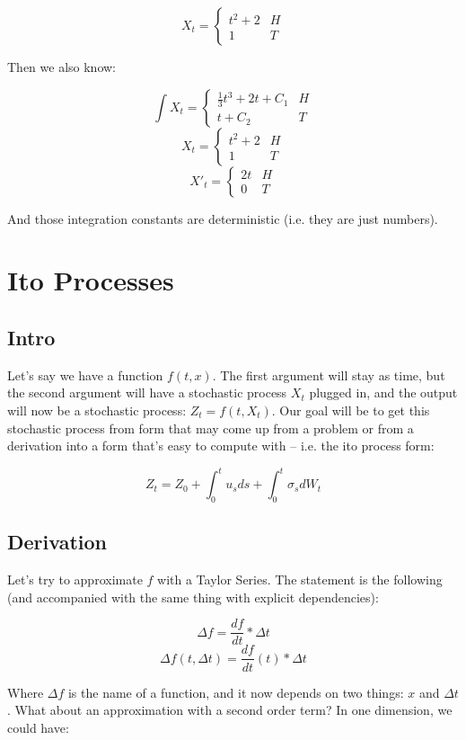 \documentclass{article}
\begin{document}
\[X_t = \begin{cases} 
    t^2 + 2 & H \\
    1 & T 
 \end{cases}
\]

Then we also know:

\[\int X_t = \begin{cases} 
    \frac{1}{3}t^3 + 2t + C_1 & H \\
    t + C_2 & T 
 \end{cases}
\]
\[X_t = \begin{cases} 
    t^2 + 2 & H \\
    1 & T 
 \end{cases}
\]
\[X'_t = \begin{cases} 
    2t & H \\
    0 & T 
 \end{cases}
\]

And those integration constants are deterministic (i.e. they are just numbers).

\section{Ito Processes}

\subsection{Intro}

Let's say we have a function $f(t,x)$.  The first argument will stay as time, but the second argument will have a stochastic process $X_t$ plugged in, and the output will now be a stochastic process: $Z_t = f(t,X_t)$.  Our goal will be to get this stochastic process from form that may come up from a problem or from a derivation into a form that's easy to compute with -- i.e. the ito process form:

$$Z_t = Z_0 + \int_{0}^{t} u_s ds + \int_{0}^{t} \sigma_s dW_t$$

\subsection{Derivation}

Let's try to approximate $f$ with a Taylor Series.  The statement is the following (and accompanied with the same thing with explicit dependencies):

$$\Delta f = \frac{df}{dt} * \Delta t$$
$$\Delta f(t, \Delta t) = \frac{df}{dt}(t) * \Delta t$$

Where $\Delta f$ is the name of a function, and it now depends on two things: $x$ and $\Delta t$.  What about an approximation with a second order term?  In one dimension, we could have:
\end{document}
